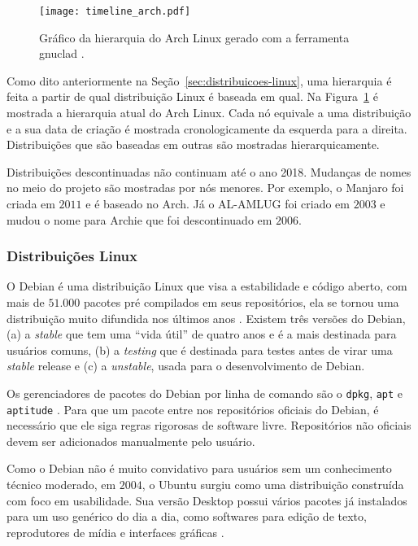 \documentclass[
article,			%
12pt,				%
openright,			%
oneside,			%
a4paper,			%
chapter=TITLE,		%
section=TITLE,		%
subsection=TITLE,	%
subsubsection=TITLE,%
subsubsubsection=TITLE, %
english,			%
brazil,				%
]{abntex2}
\def\code#1{\texttt{#1}}
\begin{document}
\begin{figure}[H]
    \caption[Gráfico da hierarquia do Arch Linux]{\label{fig:hierarquia-arch}Gráfico da hierarquia do Arch
    Linux gerado com a ferramenta gnuclad \cite{Loli2017}.}
    \begin{center}
        \texttt{[image: timeline\_arch.pdf]}
    \end{center}
\end{figure}

Como dito anteriormente na Seção~\ref{sec:distribuicoes-linux}, uma
hierarquia é feita a partir de qual distribuição Linux é baseada em
qual. Na Figura~\ref{fig:hierarquia-arch} é mostrada a hierarquia
atual do Arch Linux. Cada nó equivale a uma distribuição e a sua data
de criação é mostrada cronologicamente da esquerda para a direita.
Distribuições que são baseadas em outras são mostradas
hierarquicamente. 

Distribuições descontinuadas não continuam até o ano 2018. Mudanças de
nomes no meio do projeto são mostradas por nós menores. Por exemplo, o
Manjaro foi criada em $2011$ e é baseado no Arch. Já o AL-AMLUG foi
criado em $2003$ e mudou o nome para Archie que foi descontinuado em
$2006$.

\subsubsection{Distribuições Linux}


O Debian é uma distribuição Linux que visa a estabilidade e código
aberto, com mais de $51.000$ pacotes pré compilados em seus
repositórios, ela se tornou uma distribuição muito difundida nos
últimos anos \cite{Debian2018}. Existem três versões do Debian,
(a) a \emph{stable} que tem uma ``vida útil'' de quatro anos e é a
mais destinada para usuários comuns, (b) a \emph{testing} que é
destinada para testes antes de virar uma \emph{stable} release e (c) a
\emph{unstable}, usada para o desenvolvimento de Debian.

Os gerenciadores de pacotes do Debian por linha de comando são o
\code{dpkg}, \code{apt} e \code{aptitude} \cite{Debian2016}. Para que
um pacote entre nos repositórios oficiais do Debian, é necessário que
ele siga regras rigorosas de software livre. Repositórios não oficiais
devem ser adicionados manualmente pelo usuário.


Como o Debian não é muito convidativo para usuários sem um
conhecimento técnico moderado, em $2004$, o Ubuntu surgiu como uma
distribuição construída com foco em usabilidade. Sua versão Desktop
possui vários pacotes já instalados para um uso genérico do dia a dia,
como softwares para edição de texto, reprodutores de mídia e
interfaces gráficas \cite{UbuntuFundation2018}.
\end{document}
